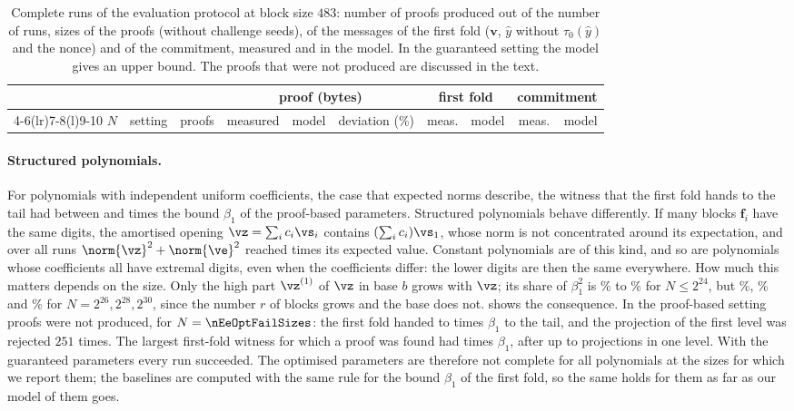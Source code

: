 \begin{table}[t]
\centering\small
\setlength{\tabcolsep}{3.2pt}
\begin{tabular}{@{}llrrrrrrrr@{}}
\toprule
 & & & \multicolumn{3}{c}{proof (bytes)} & \multicolumn{2}{c}{first fold} & \multicolumn{2}{c}{commitment}\\
\cmidrule(lr){4-6}\cmidrule(lr){7-8}\cmidrule(l){9-10}
$N$ & setting & proofs & measured & model & deviation (\%) & meas. & model & meas. & model\\
\midrule

\bottomrule
\end{tabular}
\caption{Complete runs of the evaluation protocol at block size $483$: number of proofs produced out of the number of runs, sizes of the proofs (without challenge seeds), of the messages of the first fold ($\mathbf v$, $\hat y$ without $\tau_0(\hat y)$ and the nonce) and of the commitment, measured and in the model. In the guaranteed setting the model gives an upper bound. The proofs that were not produced are discussed in the text.}
\label{tab:e2e}
\end{table}

\paragraph{Structured polynomials.}
For polynomials with independent uniform coefficients, the case that expected norms describe, the witness that the first fold hands to the tail had between \nEeOptUniFillLo{} and \nEeOptUniFillHi{} times the bound $\beta_1$ of the proof-based parameters. Structured polynomials behave differently. If many blocks $\mathbf f_i$ have the same digits, the amortised opening $\vz=\sum_ic_i\vs_i$ contains $(\sum_ic_i)\vs_1$, whose norm is not concentrated around its expectation, and over all runs $\norm{\vz}^2+\norm{\ve}^2$ reached \nEeZeMax{} times its expected value. Constant polynomials are of this kind, and so are polynomials whose coefficients all have extremal digits, even when the coefficients differ: the lower digits are then the same everywhere. How much this matters depends on the size. Only the high part $\vz^{(1)}$ of $\vz$ in base $b$ grows with $\vz$; its share of $\beta_1^2$ is \nEeZshareSmallLo\% to \nEeZshareSmallHi\% for $N\le2^{24}$, but \nEeZshareSix\%, \nEeZshareEight\% and \nEeZshareThirty\% for $N=2^{26},2^{28},2^{30}$, since the number $r$ of blocks grows and the base does not.  shows the consequence. In the proof-based setting \nEeOptFails{} proofs were not produced, for $N=\nEeOptFailSizes$: the first fold handed \nEeFailFillLo{} to \nEeFailFillHi{} times $\beta_1$ to the tail, and the projection of the first level was rejected $251$ times. The largest first-fold witness for which a proof was found had \nEeOkFillHi{} times $\beta_1$, after up to \nEeOptJlMax{} projections in one level. With the guaranteed parameters every run succeeded. The optimised parameters are therefore not complete for all polynomials at the sizes for which we report them; the baselines are computed with the same rule for the bound $\beta_1$ of the first fold, so the same holds for them as far as our model of them goes.

